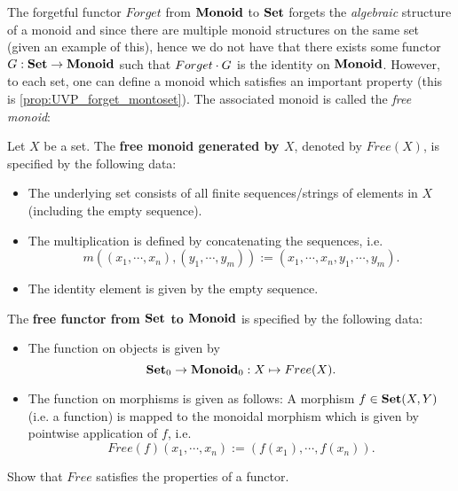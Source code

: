 The forgetful functor $Forget$ from $\mathbf{Monoid}$ to $\mathbf{Set}$ forgets the \textit{algebraic} structure of a monoid and since there are multiple monoid structures on the same set (given an example of this), hence we do not have that there exists some functor $G: \mathbf{Set}\to \mathbf{Monoid}$ such that $Forget\cdot G$ is the identity on $\mathbf{Monoid}$. However, to each set, one can define a monoid which satisfies an important property (this is \cref{prop:UVP_forget_montoset}). The associated monoid is called the \textit{free monoid}:
\begin{exa} Let $X$ be a set. The \textbf{free monoid generated by $X$}, denoted by $Free(X)$, is specified by the following data:
\begin{itemize}
\item The underlying set consists of all finite sequences/strings of elements in $X$ (including the empty sequence).
\item The multiplication is defined by concatenating the sequences, i.e. 
$$m\left((x_1,\cdots,x_n),(y_1,\cdots,y_m)\right) := (x_1,\cdots,x_n,y_1,\cdots,y_m).$$
\item The identity element is given by the empty sequence.
\end{itemize}
\end{exa}

\begin{exa}\label{exa:freemonoids} The \textbf{free functor from $\mathbf{Set}$ to $\mathbf{Monoid}$} is specified by the following data:
\begin{itemize}
\item The function on objects is given by 
\[
{\mathbf{Set}}_0\to {\mathbf{Monoid}}_0: X\mapsto Free(X).
\]
\item The function on morphisms is given as follows: A morphism $f \in {\mathbf{Set}}(X,Y)$ (i.e. a function) is mapped to the monoidal morphism which is given by pointwise application of $f$, i.e.
\[
Free(f)(x_1,\cdots,x_n) := (f(x_1),\cdots, f(x_n)).
\]
\end{itemize}
\end{exa}

\begin{exer} Show that $Free$ satisfies the properties of a functor.
\end{exer}


